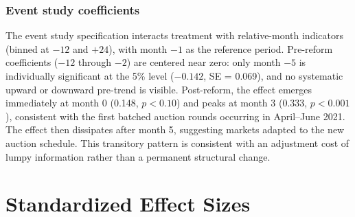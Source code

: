 \documentclass[12pt]{article}
\begin{document}
\subsubsection*{Event study coefficients} The event study specification interacts treatment with relative-month indicators (binned at $-12$ and $+24$), with month $-1$ as the reference period. Pre-reform coefficients ($-12$ through $-2$) are centered near zero: only month $-5$ is individually significant at the 5\% level ($-0.142$, SE = 0.069), and no systematic upward or downward pre-trend is visible. Post-reform, the effect emerges immediately at month 0 (0.148, $p < 0.10$) and peaks at month 3 (0.333, $p < 0.001$), consistent with the first batched auction rounds occurring in April--June 2021. The effect then dissipates after month 5, suggesting markets adapted to the new auction schedule. This transitory pattern is consistent with an adjustment cost of lumpy information rather than a permanent structural change.

\section{Standardized Effect Sizes}
\label{sec:sde}


\end{document}
